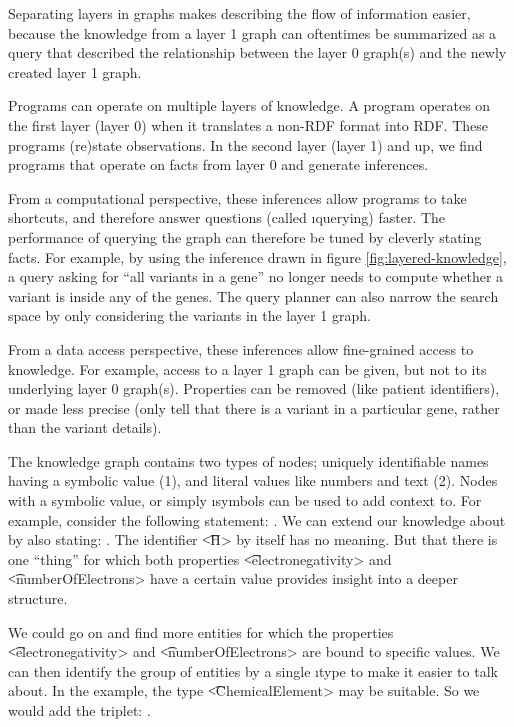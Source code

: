   Separating layers in graphs makes describing the flow of information easier,
  because the knowledge from a layer 1 graph can oftentimes be summarized as a
  query that described the relationship between the layer 0 graph(s) and the
  newly created layer 1 graph.

  Programs can operate on multiple layers of knowledge.  A program operates
  on the first layer (layer 0) when it translates a non-RDF format into RDF.
  These programs (re)state observations.  In the second layer (layer 1) and
  up, we find programs that operate on facts from layer 0 and generate
  inferences.

  From a computational perspective, these inferences allow programs to take
  shortcuts, and therefore answer questions (called \i{querying}) faster.
  The performance of querying the graph can therefore be tuned by cleverly
  stating facts.  For example, by using the inference drawn in figure
  \ref{fig:layered-knowledge}, a query asking for ``all variants in a gene''
  no longer needs to compute whether a variant is inside any of the
  genes.  The query planner can also narrow the search space by only
  considering the variants in the layer 1 graph.

  From a data access perspective, these inferences allow fine-grained access
  to knowledge.  For example, access to a layer 1 graph can be given, but
  not to its underlying layer 0 graph(s).  Properties can be removed (like
  patient identifiers), or made less precise (only tell that there is a
  variant in a particular gene, rather than the variant details).

  The knowledge graph contains two types of nodes; uniquely identifiable
  names having a symbolic value (1), and literal values like numbers and
  text (2).  Nodes with a symbolic value, or simply \i{symbols} can be used
  to add context to.  For example, consider the following statement:
  .  We can extend our knowledge
  about  by also stating: .
  The identifier \t{<H>} by itself has no meaning.  But that there is one
  ``thing'' for which both properties \t{<electronegativity>} and
  \t{<numberOfElectrons>} have a certain value provides insight into a
  deeper structure.

  We could go on and find more entities for which the properties
  \t{<electronegativity>} and \t{<numberOfElectrons>} are bound to
  specific values.  We can then identify the group of entities by a single
  \i{type} to make it easier to talk about.   In the example, the type
  \t{<ChemicalElement>} may be suitable.  So we would add the triplet:
  .

